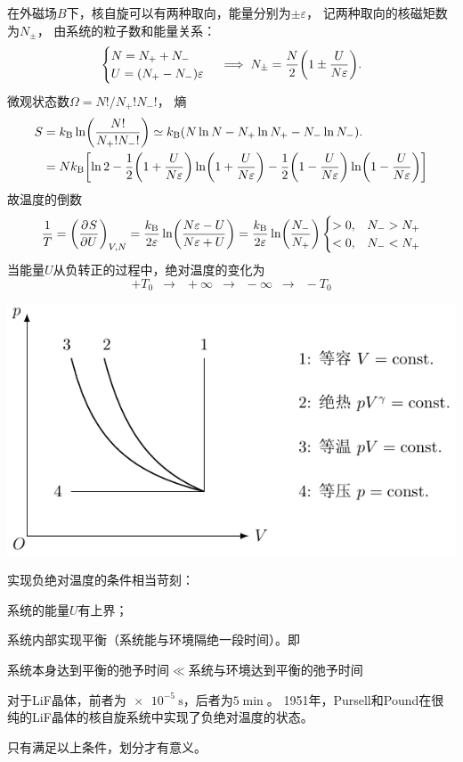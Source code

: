 在外磁场$B$下，核自旋可以有两种取向，能量分别为$\pm\varepsilon$，
记两种取向的核磁矩数为$N_\pm$，
由系统的粒子数和能量关系：
\[
	\begin{cases}
		N=N_++N_- \\
		U=(N_+-N_-)\varepsilon
	\end{cases}
	\implies
	N_\pm=\frac N2\biggkh{1\pm\frac U{N\varepsilon}}.
\]
微观状态数$\Omega=N!/N_+!N_-!$，
熵
\begin{align*}
	S & =\kB\ln\biggkh{\frac{N!}{N_+!N_-!}}\simeq\kB(N\ln N-N_+\ln N_+-N_-\ln N_-).
	  \\& =N\kB\biggfkh{\ln 2-\frac12\biggkh{1+\frac U{N\varepsilon}}\ln\biggkh{1+\frac U{N\varepsilon}}-\frac12\biggkh{1-\frac U{N\varepsilon}}\ln\biggkh{1-\frac U{N\varepsilon}}}
\end{align*}
故温度的倒数
\begin{equation}
	\frac1T=\pu[V,N]SU=\frac\kB{2\varepsilon}\ln\biggkh{\frac{N\varepsilon-U}{N\varepsilon+U}}=\frac\kB{2\varepsilon}\ln\biggkh{\frac{N_-}{N_+}}
	\begin{cases}
		>0,&N_->N_+\\
		<0,&N_-<N_+
	\end{cases}
\end{equation}
当能量$U$从负转正的过程中，绝对温度的变化为
\[
	+T_0\enspace\longrightarrow\enspace+\infty\enspace\to\enspace -\infty\enspace\longrightarrow\enspace-T_0
\]
\begin{center}
	\includegraphics[page=22]{figures/tikz/coordinates.pdf}
\end{center}

\begin{remark}
	实现负绝对温度的条件相当苛刻：
	\begin{compactenum}
		\item 系统的能量$U$有上界；
		\item 系统内部实现平衡（系统能与环境隔绝一段时间）。即
		\begin{center}
			系统本身达到平衡的弛予时间$\ll$系统与环境达到平衡的弛予时间
		\end{center}
		对于LiF晶体，前者为$\SI{e-5}\s$，后者为$\SI{5}\min$。
		1951年，Pursell和Pound在很纯的LiF晶体的核自旋系统中实现了负绝对温度的状态。
	\end{compactenum}
	只有满足以上条件，划分才有意义。
\end{remark}

